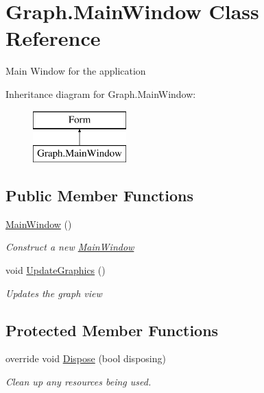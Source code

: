 \hypertarget{class_graph_1_1_main_window}{}\section{Graph.\+Main\+Window Class Reference}
\label{class_graph_1_1_main_window}


Main Window for the application  


Inheritance diagram for Graph.\+Main\+Window\+:\begin{figure}[H]
\begin{center}
\leavevmode
\includegraphics[height=2.000000cm]{class_graph_1_1_main_window}
\end{center}
\end{figure}
\subsection*{Public Member Functions}
\begin{DoxyCompactItemize}
\item 
\hyperlink{class_graph_1_1_main_window_a4e5941eebddebf1918da2106ee3d7e22}{Main\+Window} ()
\begin{DoxyCompactList}\small\item\em Construct a new \hyperlink{class_graph_1_1_main_window}{Main\+Window} \end{DoxyCompactList}\item 
void \hyperlink{class_graph_1_1_main_window_a6aec2f5a712c2581c9cd08878251af3f}{Update\+Graphics} ()
\begin{DoxyCompactList}\small\item\em Updates the graph view \end{DoxyCompactList}\end{DoxyCompactItemize}
\subsection*{Protected Member Functions}
\begin{DoxyCompactItemize}
\item 
override void \hyperlink{class_graph_1_1_main_window_a79dbc89bca54467324ea936e580f380e}{Dispose} (bool disposing)
\begin{DoxyCompactList}\small\item\em Clean up any resources being used. \end{DoxyCompactList}\end{DoxyCompactItemize}


